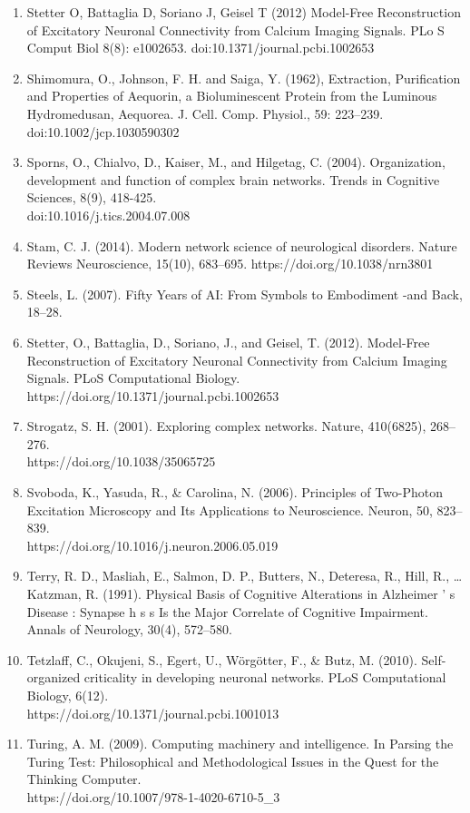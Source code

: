 \documentclass[11pt,titlepage]{article}
\begin{document}
\begin{spacing}{1}
\begin{enumerate}
\item Stetter  O,  Battaglia  D,  Soriano  J,  Geisel  T  (2012)  Model-Free  Reconstruction  of  Excitatory  Neuronal  Connectivity  from  Calcium  Imaging  Signals.  PLo S Comput  Biol  8(8):  e1002653. doi:10.1371/journal.pcbi.1002653
\item Shimomura, O., Johnson, F. H. and Saiga, Y. (1962), Extraction, Purification and Properties of Aequorin, a Bioluminescent Protein from the Luminous Hydromedusan, Aequorea. J. Cell. Comp. Physiol., 59: 223–239. doi:10.1002/jcp.1030590302
\item Sporns, O., Chialvo, D., Kaiser, M., and Hilgetag, C. (2004). Organization, development and function of complex brain networks. Trends in Cognitive Sciences, 8(9), 418-425. \\doi:10.1016/j.tics.2004.07.008
\item Stam, C. J. (2014). Modern network science of neurological disorders. Nature Reviews Neuroscience, 15(10), 683–695. https://doi.org/10.1038/nrn3801
\item Steels, L. (2007). Fifty Years of AI: From Symbols to Embodiment -and Back, 18–28.
\item Stetter, O., Battaglia, D., Soriano, J., and Geisel, T. (2012). Model-Free Reconstruction of Excitatory Neuronal Connectivity from Calcium Imaging Signals. PLoS Computational Biology. https://doi.org/10.1371/journal.pcbi.1002653
\item Strogatz, S. H. (2001). Exploring complex networks. Nature, 410(6825), 268–276.\\https://doi.org/10.1038/35065725
\item Svoboda, K., Yasuda, R., \& Carolina, N. (2006). Principles of Two-Photon Excitation Microscopy and Its Applications to Neuroscience. Neuron, 50, 823–839.\\https://doi.org/10.1016/j.neuron.2006.05.019
\item Terry, R. D., Masliah, E., Salmon, D. P., Butters, N., Deteresa, R., Hill, R., … Katzman, R. (1991). Physical Basis of Cognitive Alterations in Alzheimer ’ s Disease : Synapse h s s Is the Major Correlate of Cognitive Impairment. Annals of Neurology, 30(4), 572–580.
\item Tetzlaff, C., Okujeni, S., Egert, U., Wörgötter, F., \& Butz, M. (2010). Self-organized criticality in developing neuronal networks. PLoS Computational Biology, 6(12).\\https://doi.org/10.1371/journal.pcbi.1001013
\item Turing, A. M. (2009). Computing machinery and intelligence. In Parsing the Turing Test: Philosophical and Methodological Issues in the Quest for the Thinking Computer.\\https://doi.org/10.1007/978-1-4020-6710-5\_3

\end{enumerate}
\end{spacing}
\end{document}
